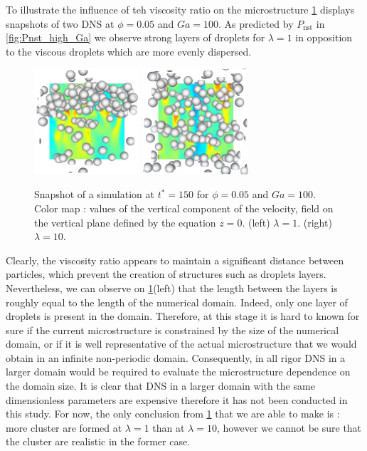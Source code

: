 To illustrate the influence of teh viscosity ratio on the microstructure \ref{fig:images} displays snapshots of two DNS at $\phi = 0.05$ and $Ga = 100$. 
As predicted by $P_\text{nst}$ in \ref{fig:Pnst_high_Ga} we observe strong layers of droplets for $\lambda = 1$ in opposition to the viscous droplets which are more evenly dispersed. 
\begin{figure}[h!]
    \centering
    \includegraphics[width=0.35\textwidth]{image/HOMOGENEOUS_NEW/P_PHI_5_l_10_Ga_100.png}
    \includegraphics[width=0.35\textwidth]{image/HOMOGENEOUS_NEW/P_PHI_5_l_1_Ga_100.png}
    \caption{Snapshot of a simulation at $t^* = 150$ for $\phi=0.05$ and $Ga=100$.
    Color map : values of the vertical component of the velocity, field on the vertical plane defined by the equation $z=0$. 
    (left)  $\lambda = 1$.
    (right)  $\lambda = 10$.
    }
    \label{fig:images}
\end{figure}
Clearly, the viscosity ratio appears to maintain a significant distance between particles, which prevent the creation of structures such as droplets layers. 
Nevertheless, we can observe on \ref{fig:images}(left) that the length between the layers is roughly equal to the length of the numerical domain. 
Indeed, only one layer of droplets is present in the domain. 
Therefore, at this stage it is hard to known for sure if the current microstructure is constrained by the size of the numerical domain, or if it is well representative of the actual microstructure that we would obtain in an infinite non-periodic domain. 
Consequently, in all rigor DNS in a larger domain would be required to evaluate the microstructure dependence on the domain size. 
It is clear that DNS in a larger domain with the same dimensionless parameters are expensive therefore it has not been conducted in this study. 
For now, the only conclusion from  \ref{fig:images} that we are able to make is : more cluster are formed at $\lambda =1$ than at $\lambda = 10$, however we cannot be sure that the cluster are realistic in the former case.



